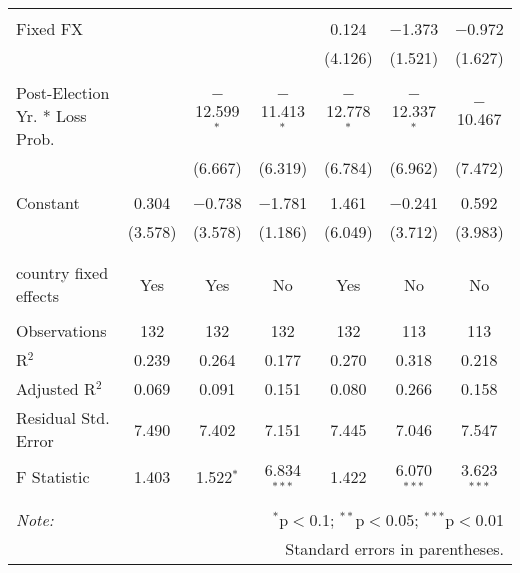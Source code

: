 \begin{tabular}{@{\extracolsep{5pt}}lcccccc}
  & & & & & & \\ 
 Fixed FX &  &  &  & 0.124 & $-$1.373 & $-$0.972 \\ 
  &  &  &  & (4.126) & (1.521) & (1.627) \\ 
  & & & & & & \\ 
 Post-Election Yr. * Loss Prob. &  & $-$12.599$^{*}$ & $-$11.413$^{*}$ & $-$12.778$^{*}$ & $-$12.337$^{*}$ & $-$10.467 \\ 
  &  & (6.667) & (6.319) & (6.784) & (6.962) & (7.472) \\ 
  & & & & & & \\ 
 Constant & 0.304 & $-$0.738 & $-$1.781 & 1.461 & $-$0.241 & 0.592 \\ 
  & (3.578) & (3.578) & (1.186) & (6.049) & (3.712) & (3.983) \\ 
  & & & & & & \\ 
\hline \\[-1.8ex] 
country fixed effects & Yes & Yes & No & Yes & No & No \\ 
\hline \\[-1.8ex] 
Observations & 132 & 132 & 132 & 132 & 113 & 113 \\ 
R$^{2}$ & 0.239 & 0.264 & 0.177 & 0.270 & 0.318 & 0.218 \\ 
Adjusted R$^{2}$ & 0.069 & 0.091 & 0.151 & 0.080 & 0.266 & 0.158 \\ 
Residual Std. Error & 7.490 & 7.402 & 7.151 & 7.445 & 7.046 & 7.547 \\ 
F Statistic & 1.403 & 1.522$^{*}$ & 6.834$^{***}$ & 1.422 & 6.070$^{***}$ & 3.623$^{***}$ \\ 
\hline 
\hline \\[-1.8ex] 
\textit{Note:}  & \multicolumn{6}{r}{$^{*}$p$<$0.1; $^{**}$p$<$0.05; $^{***}$p$<$0.01} \\ 
 & \multicolumn{6}{r}{Standard errors in parentheses.} \\ 
\end{tabular} 
\endgroup 
